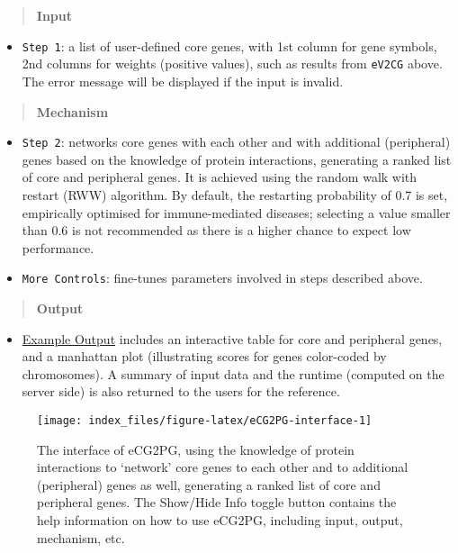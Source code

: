 \documentclass[
  oneside]{book}
\providecommand{\tightlist}{%
  \setlength{\itemsep}{0pt}\setlength{\parskip}{0pt}}
\begin{document}
\begin{quote}
\textbf{Input}
\end{quote}

\begin{itemize}
\tightlist
\item
  \texttt{Step\ 1}: a list of user-defined core genes, with 1st column for gene symbols, 2nd columns for weights (positive values), such as results from \texttt{eV2CG} above. The error message will be displayed if the input is invalid.
\end{itemize}

\begin{quote}
\textbf{Mechanism}
\end{quote}

\begin{itemize}
\item
  \texttt{Step\ 2}: networks core genes with each other and with additional (peripheral) genes based on the knowledge of protein interactions, generating a ranked list of core and peripheral genes. It is achieved using the random walk with restart (RWW) algorithm. By default, the restarting probability of 0.7 is set, empirically optimised for immune-mediated diseases; selecting a value smaller than 0.6 is not recommended as there is a higher chance to expect low performance.
\item
  \texttt{More\ Controls}: fine-tunes parameters involved in steps described above.
\end{itemize}

\begin{quote}
\textbf{Output}
\end{quote}

\begin{itemize}
\tightlist
\item
  \href{http://www.genetictargets.com/app/examples/_tmp_RMD_eCG2PG.html}{Example Output} includes an interactive table for core and peripheral genes, and a manhattan plot (illustrating scores for genes color-coded by chromosomes). A summary of input data and the runtime (computed on the server side) is also returned to the users for the reference.
\end{itemize}

\begin{figure}

{\centering \texttt{[image: index\_files/figure-latex/eCG2PG-interface-1]} 

}

\caption{The interface of eCG2PG, using the knowledge of protein interactions to ‘network’ core genes to each other and to additional (peripheral) genes as well, generating a ranked list of core and peripheral genes. The Show/Hide Info toggle button contains the help information on how to use eCG2PG, including input, output, mechanism, etc.}\label{fig:eCG2PG-interface}
\end{figure}
\end{document}
